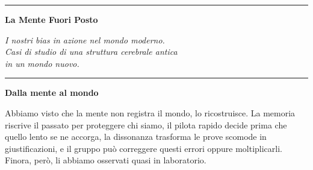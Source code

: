 

\cleardoublepage
\thispagestyle{empty}

\vspace*{\fill}

\begin{center}
    {\sffamily\huge{}}
    
    \vspace{1.5em}
    
    \rule{0.5\textwidth}{0.4pt}
    
    \vspace{1.5em}
    
    {\sffamily\Huge\bfseries La Mente Fuori Posto}
    
    \vspace{2em}
    
    \begin{minipage}{0.7\textwidth}
        \centering
        {\large\itshape\color{moderngray}
        I nostri bias in azione nel mondo moderno.\\
        Casi di studio di una struttura cerebrale antica\\
        in un mondo nuovo.}
    \end{minipage}
    
    \vspace{1.5em}
    
    \rule{0.5\textwidth}{0.4pt}
\end{center}

\vspace*{\fill}

\clearpage
\thispagestyle{empty}
\vspace*{2em}
\begin{center}
	{\sffamily\large\bfseries\color{darkgray} Dalla mente al mondo}
\end{center}
\vspace{1em}

Abbiamo visto che la mente non registra il mondo, lo ricostruisce. La memoria riscrive il passato per proteggere chi siamo, il pilota rapido decide prima che quello lento se ne accorga, la dissonanza trasforma le prove scomode in giustificazioni, e il gruppo può correggere questi errori oppure moltiplicarli. Finora, però, li abbiamo osservati quasi in laboratorio.

